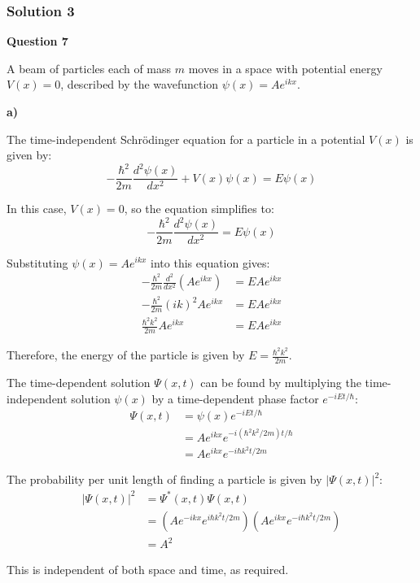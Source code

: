\documentclass{article}
\begin{document}
\subsubsection{Solution 3}
\textbf{Question 7}

A beam of particles each of mass $m$ moves in a space with potential energy $V(x) = 0$, described by the wavefunction $\psi(x) = Ae^{ikx}$.

\textbf{a)} 

The time-independent Schrödinger equation for a particle in a potential $V(x)$ is given by:
\begin{equation*}
-\frac{\hbar^2}{2m} \frac{d^2 \psi(x)}{dx^2} + V(x) \psi(x) = E \psi(x)
\end{equation*}

In this case, $V(x) = 0$, so the equation simplifies to:
\begin{equation*}
-\frac{\hbar^2}{2m} \frac{d^2 \psi(x)}{dx^2} = E \psi(x)
\end{equation*}

Substituting $\psi(x) = Ae^{ikx}$ into this equation gives:
\begin{align*}
-\frac{\hbar^2}{2m} \frac{d^2}{dx^2} (Ae^{ikx}) &= E Ae^{ikx} \\
-\frac{\hbar^2}{2m} (ik)^2 Ae^{ikx} &= E Ae^{ikx} \\
\frac{\hbar^2 k^2}{2m} Ae^{ikx} &= E Ae^{ikx}
\end{align*}

Therefore, the energy of the particle is given by $E = \frac{\hbar^2 k^2}{2m}$.

The time-dependent solution $\Psi(x,t)$ can be found by multiplying the time-independent solution $\psi(x)$ by a time-dependent phase factor $e^{-iEt/\hbar}$:
\begin{align*}
\Psi(x,t) &= \psi(x) e^{-iEt/\hbar} \\
&= Ae^{ikx} e^{-i(\hbar^2 k^2 / 2m)t/\hbar} \\
&= Ae^{ikx} e^{-i \hbar k^2 t / 2m}
\end{align*}

The probability per unit length of finding a particle is given by $|\Psi(x,t)|^2$:
\begin{align*}
|\Psi(x,t)|^2 &= \Psi^*(x,t) \Psi(x,t) \\
&= (Ae^{-ikx} e^{i \hbar k^2 t / 2m})(Ae^{ikx} e^{-i \hbar k^2 t / 2m}) \\
&= A^2
\end{align*}

This is independent of both space and time, as required.
\end{document}
